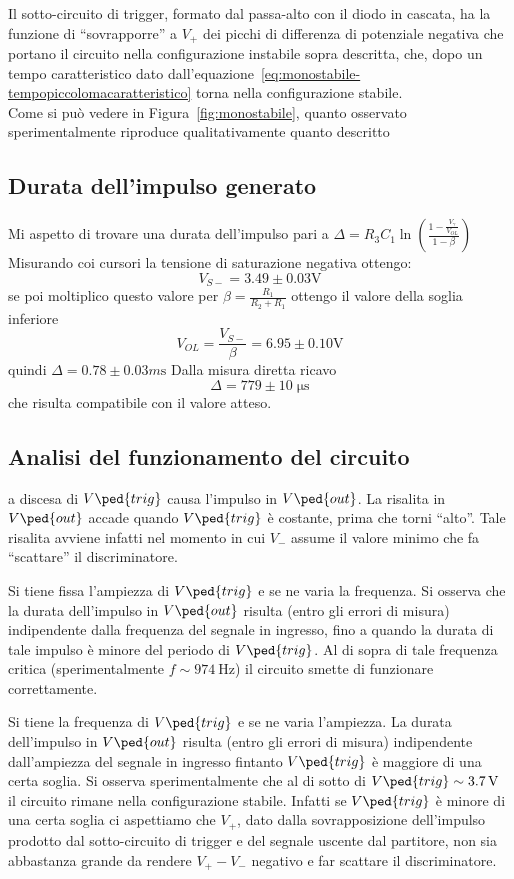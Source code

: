 \documentclass[10pt,a4paper]{article}
\begin{document}
Il sotto-circuito di trigger, formato dal passa-alto con il diodo in cascata, ha la funzione di ``sovrapporre'' a $ V_{+} $ dei picchi di differenza di potenziale negativa che portano il circuito nella configurazione instabile sopra descritta, che, dopo un tempo caratteristico dato dall'equazione~\eqref{eq:monostabile-tempopiccolomacaratteristico} torna nella configurazione stabile. \\

Come si può vedere in Figura~\ref{fig:monostabile}, quanto osservato sperimentalmente riproduce qualitativamente quanto descritto

\subsection{Durata dell'impulso generato}
Mi aspetto di trovare una durata dell'impulso pari a $\Delta= R_3 C_1 \ln(\frac{1 - \frac{V_\gamma}{V_{OL}}}{1 - \beta})$
Misurando coi cursori la tensione di saturazione negativa ottengo:
\[
V_{S-}= 3.49 \pm 0.03 \si{\V}
\]
se poi moltiplico questo valore per $\beta=\frac{R_1}{R_2+R_1}$ ottengo il valore della soglia inferiore
\[
V_{OL} = \frac{V_{S-}}{\beta} = 6.95 \pm 0.10 \si{\V}
\]
quindi $\Delta= 0.78 \pm 0.03 \si{m\s}$
Dalla misura diretta ricavo
\[
\Delta= 779 \pm 10 \;\si{\micro\s}
\]
che risulta compatibile con il valore atteso.
\subsection{Analisi del funzionamento del circuito}
a discesa di $ V\ped{trig} $ causa l'impulso in $ V\ped{out} $. La risalita in $ V\ped{out} $ accade quando $ V\ped{trig} $ è costante, prima che torni ``alto''. Tale risalita avviene infatti nel momento in cui $ V_{-} $ assume il valore minimo che fa ``scattare'' il discriminatore.

Si tiene fissa l'ampiezza di $ V\ped{trig} $ e se ne varia la frequenza. Si osserva che la durata dell'impulso in $ V \ped{out} $ risulta (entro gli errori di misura) indipendente dalla frequenza del segnale in ingresso, fino a quando la durata di tale impulso è minore del periodo di $ V\ped{trig} $. Al di sopra di tale frequenza critica (sperimentalmente $ f \sim \SI{974}{\hertz} $) il circuito smette di funzionare correttamente.

Si tiene la frequenza di $ V\ped{trig} $ e se ne varia l'ampiezza. La durata dell'impulso in $ V\ped{out} $ risulta (entro gli errori di misura) indipendente dall'ampiezza del segnale in ingresso fintanto $ V\ped{trig} $ è maggiore di una certa soglia. Si osserva sperimentalmente che al di sotto di $ V\ped{trig} \sim \SI{3.7}{\volt} $ il circuito rimane nella configurazione stabile. Infatti se $ V\ped{trig} $ è minore di una certa soglia ci aspettiamo che $ V_{+} $, dato dalla sovrapposizione dell'impulso prodotto dal sotto-circuito di trigger e del segnale uscente dal partitore, non sia abbastanza grande da rendere $ V_{+} - V_{-} $ negativo e far scattare il discriminatore.
\end{document}
